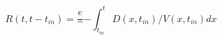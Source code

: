 \begin{equation}
R(t,t-t_{in}) = \frac e^{-\int_{t_{in}}^t D(x,t_{in})/V(x,t_{in}) dx}
\end{equation}